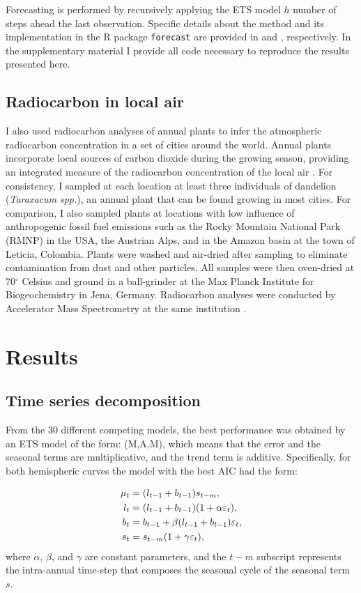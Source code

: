 \documentclass[a4paper, 11pt]{article}
\begin{document}
Forecasting is performed by recursively applying the ETS model $h$ number of steps ahead the last observation. Specific details about the method and its implementation in the R package {\tt forecast} are provided in \citet{Hyndman2008} and \citet{Hyndman2008JSS}, respectively. In the supplementary material I provide all code necessary to reproduce the results presented here.

\subsection{Radiocarbon in local air}
I also used radiocarbon analyses of annual plants to infer the atmospheric radiocarbon concentration in a set of cities around the world. Annual plants incorporate local sources of carbon dioxide during the growing season, providing an integrated measure of the radiocarbon concentration of the local air \citep{Hsueh2007GRL}. For consistency, I sampled at each location at least three individuals of dandelion ({\it Taraxacum spp.}), an annual plant that can be found growing in most cities. For comparison, I also sampled plants at locations with low influence of anthropogenic fossil fuel emissions such as the Rocky Mountain National Park (RMNP) in the USA, the Austrian Alps, and in the Amazon basin at the town of Leticia, Colombia. Plants were washed and air-dried after sampling to eliminate contamination from dust and other particles.   All samples were then oven-dried at 70$^{\circ}$ Celsius and ground in a ball-grinder at the Max Planck Institute for Biogeochemistry in Jena, Germany. Radiocarbon analyses were conducted by Accelerator Mass Spectrometry at the same institution \citep{Steinhof2004Radiocarbon}. 

\section{Results}
\subsection{Time series decomposition}
From the 30 different competing models, the best performance was obtained by an ETS model of the form: (M,A,M), which means that the 
error and the seasonal terms are multiplicative, and the trend term is additive. Specifically, for both hemispheric curves the model with
the best AIC had the form:

\begin{align}
\mu_t &= (l_{t-1} + b_{t-1}) s_{t-m}, \notag \\
l_t &= (l_{t-1} + b_{t-1}) (1 + \alpha \varepsilon_t), \notag \\
b_t &= b_{t-1} + \beta (l_{t-1} + b_{t-1})\varepsilon_t , \notag \\
s_t &= s_{t-m} (1+ \gamma \varepsilon_t), \notag
\end{align}
where $\alpha$, $\beta$, and $\gamma$ are constant parameters, and  the $t-m$ subscript represents the intra-annual time-step that composes the seasonal cycle of the seasonal term $s$. 
\end{document}
